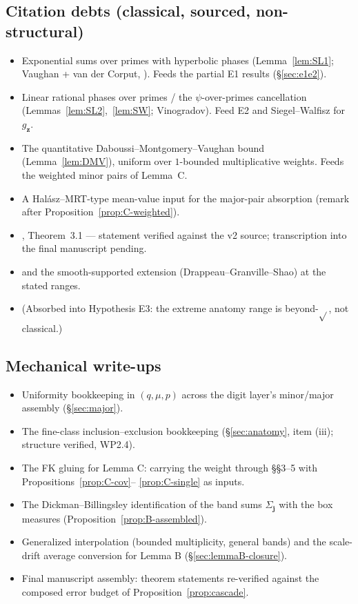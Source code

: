 \subsection*{Citation debts (classical, sourced, non-structural)}
\begin{itemize}
\item[(SL1)] Exponential sums over primes with hyperbolic phases
(Lemma~\ref{lem:SL1}; Vaughan + van der Corput, \cite[Ch.~13]{IK04}).
Feeds the partial E1 results (\S\ref{sec:e1e2}).
\item[(SL2/SL2$'$)] Linear rational phases over primes / the
$\psi$-over-primes cancellation (Lemmas~\ref{lem:SL2},~\ref{lem:SW};
Vinogradov). Feed E2 and Siegel--Walfisz for $g_{\mathbf z}$.
\item[(DMV)] The quantitative Daboussi--Montgomery--Vaughan bound
(Lemma~\ref{lem:DMV}), uniform over $1$-bounded multiplicative
weights. Feeds the weighted minor pairs of Lemma~C.
\item[(Hal)] A Hal\'asz--MRT-type mean-value input for the
major-pair absorption (remark after
Proposition~\ref{prop:C-weighted}).
\item[(TT)] \cite{TT25}, Theorem~3.1 --- statement verified against
the v2 source; transcription into the final manuscript pending.
\item[(GS/DGS)] \cite{GS} and the smooth-supported extension
(Drappeau--Granville--Shao) at the stated ranges.
\item[(Vin)] (Absorbed into Hypothesis E3: the extreme anatomy range
is beyond-$\sqrt{}$, not classical.)
\end{itemize}

\subsection*{Mechanical write-ups}
\begin{itemize}
\item[(W1)] Uniformity bookkeeping in $(q,\mu,p)$ across the digit
layer's minor/major assembly (\S\ref{sec:major}).
\item[(W2)] The fine-class inclusion--exclusion bookkeeping
(\S\ref{sec:anatomy}, item (iii); structure verified, WP2.4).
\item[(W3)] The FK gluing for Lemma C: carrying the weight through
\cite{FK21} \S\S3--5 with Propositions~\ref{prop:C-cov}--%
\ref{prop:C-single} as inputs.
\item[(W4)] The Dickman--Billingsley identification of the band sums
$\Sigma_{\mathbf j}$ with the box measures
(Proposition~\ref{prop:B-assembled}).
\item[(W6/W6$'$)] Generalized interpolation (bounded multiplicity, general bands) and the scale-drift average conversion for Lemma B (\S\ref{sec:lemmaB-closure}).
\item[(W5)] Final manuscript assembly: theorem statements
re-verified against the composed error budget of
Proposition~\ref{prop:cascade}.
\end{itemize}

